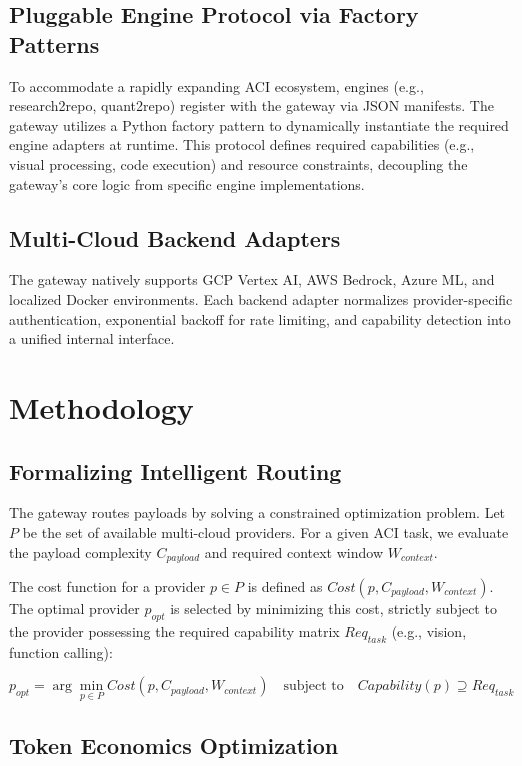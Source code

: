 \documentclass[10pt]{article}
\begin{document}
\subsection{Pluggable Engine Protocol via Factory Patterns}

To accommodate a rapidly expanding ACI ecosystem, engines (e.g., research2repo, quant2repo) register with the gateway via JSON manifests. The gateway utilizes a Python factory pattern to dynamically instantiate the required engine adapters at runtime. This protocol defines required capabilities (e.g., visual processing, code execution) and resource constraints, decoupling the gateway's core logic from specific engine implementations.

\subsection{Multi-Cloud Backend Adapters}

The gateway natively supports GCP Vertex AI, AWS Bedrock, Azure ML, and localized Docker environments. Each backend adapter normalizes provider-specific authentication, exponential backoff for rate limiting, and capability detection into a unified internal interface.

\section{Methodology}

\subsection{Formalizing Intelligent Routing}

The gateway routes payloads by solving a constrained optimization problem. Let $P$ be the set of available multi-cloud providers. For a given ACI task, we evaluate the payload complexity $C_{payload}$ and required context window $W_{context}$.

The cost function for a provider $p \in P$ is defined as $Cost(p, C_{payload}, W_{context})$. The optimal provider $p_{opt}$ is selected by minimizing this cost, strictly subject to the provider possessing the required capability matrix $Req_{task}$ (e.g., vision, function calling):

$$p_{opt} = \arg\min_{p \in P} Cost(p, C_{payload}, W_{context}) \quad \text{subject to} \quad Capability(p) \supseteq Req_{task}$$

\subsection{Token Economics Optimization}
\end{document}
